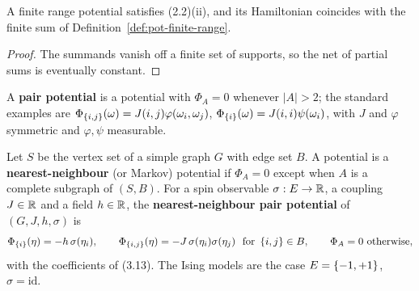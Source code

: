 \begin{lemma}
    \label{lem:pot-finite-range-summable}
    \leanok

    A finite range potential satisfies (2.2)(ii), and its Hamiltonian coincides with the finite
    sum of Definition~\ref{def:pot-finite-range}.
\end{lemma}
\begin{proof}
    \leanok

    The summands vanish off a finite set of supports, so the net of partial sums is eventually
    constant.
\end{proof}

\begin{remark}
    \label{rmk:pot-pair}

    A \textbf{pair potential} is a potential with $\Phi_A = 0$ whenever $|A| > 2$; the standard
    examples are $\Phi_{\left\{ i,j \right\}}(\omega) = J(i,j)\varphi(\omega_i, \omega_j)$,
    $\Phi_{\left\{ i \right\}}(\omega) = J(i,i)\psi(\omega_i)$, with $J$ and $\varphi$ symmetric and
    $\varphi, \psi$ measurable.
\end{remark}

\begin{definition}
    \label{def:pot-nearest-neighbour}
    \leanok

    Let $S$ be the vertex set of a simple graph $G$ with edge set $B$. A potential is a
    \textbf{nearest-neighbour} (or Markov) potential if $\Phi_A = 0$ except when $A$ is a
    complete subgraph of $(S, B)$. For a spin observable $\sigma : E \to \mathbb{R}$, a coupling
    $J \in \mathbb{R}$ and a field $h \in \mathbb{R}$, the \textbf{nearest-neighbour pair potential} of
    $(G, J, h, \sigma)$ is
    \[ \Phi_{\left\{ i \right\}}(\eta) = -h\,\sigma(\eta_i), \qquad
       \Phi_{\left\{ i,j \right\}}(\eta) = -J\,\sigma(\eta_i)\sigma(\eta_j)
       \ \text{ for } \left\{ i,j \right\} \in B, \qquad \Phi_A = 0 \text{ otherwise},\]
    with the coefficients of (3.13). The Ising models are the case
    $E = \left\{ -1, +1 \right\}$, $\sigma = \mathrm{id}$.
\end{definition}

